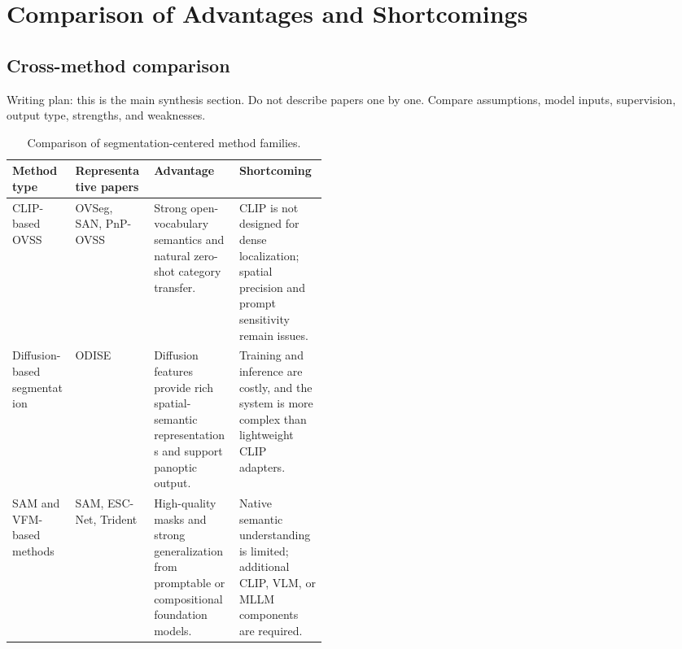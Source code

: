 \section{Comparison of Advantages and Shortcomings}
\label{sec:comparison}

\subsection{Cross-method comparison}
\label{subsec:cross-method-comparison}
Writing plan: this is the main synthesis section. Do not describe papers one by one. Compare assumptions, model inputs, supervision, output type, strengths, and weaknesses.

\begin{table}[t]
\centering
\small
\caption{Comparison of segmentation-centered method families.}
\label{tab:method-comparison-segmentation}
\begin{tabularx}{\linewidth}{p{0.20\linewidth} p{0.25\linewidth} X X}
\toprule
Method type & Representative papers & Advantage & Shortcoming \\
\midrule
CLIP-based OVSS & OVSeg, SAN, PnP-OVSS \citep{liang2023ovseg,xu2023san,luo2024pnpovss} & Strong open-vocabulary semantics and natural zero-shot category transfer. & CLIP is not designed for dense localization; spatial precision and prompt sensitivity remain issues. \\
Diffusion-based segmentation & ODISE \citep{xu2023odise} & Diffusion features provide rich spatial-semantic representations and support panoptic output. & Training and inference are costly, and the system is more complex than lightweight CLIP adapters. \\
SAM and VFM-based methods & SAM, ESC-Net, Trident \citep{kirillov2023sam,lee2025escnet,shi2025trident} & High-quality masks and strong generalization from promptable or compositional foundation models. & Native semantic understanding is limited; additional CLIP, VLM, or MLLM components are required. \\
\bottomrule
\end{tabularx}
\end{table}

